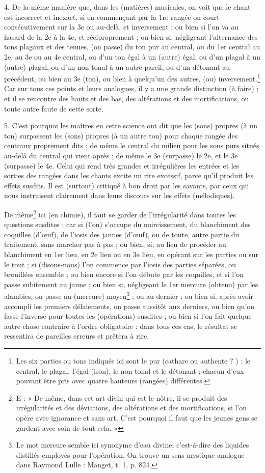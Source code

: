 \documentclass[a4paper, 11pt, oneside, polutonikogreek, french]{article}
\begin{document}
4. De la même manière que, dans les (matières) musicales, on voit que le chant est incorrect et inexact, si en commençant par la 1re rangée on court consécutivement sur la 3e ou au-delà, et inversement ; ou bien si l'on va au hasard de la 2e à la 4e, et réciproprement ; ou bien si, négligeant l'alternance des tons plagaux et des tenues, (on passe) du ton pur au central, ou du 1er central au 2e, au 3e ou au 4e central, ou d'un ton égal à un (autre) égal, ou d'un plagal à un (autre) plagal, ou d'un non-tonal à un autre pareil, ou d'un détonant au précédent, ou bien au 3e (ton), ou bien à quelqu'un des autres, (ou) inversement.\footnote{Les six parties ou tons indiqués ici sont le pur (cathare ou authente ? ) ; le central, le plagal, l'égal (ison), le non-tonal et le détonant ; chacun d'eux pouvant être pris avec quatre hauteurs (rangées) différentes.} Car sur tous ces points et leurs analogues, il y a une grande distinction (à faire) ; et il se rencontre des hauts et des bas, des altérations et des mortifications, ou toute autre faute de cette sorte.

5. C'est pourquoi les maîtres en cette science ont dit que les (sons) propres (à un ton) surpassent les (sons) propres (à un autre ton) pour chaque rangée des centraux proprement dits ; de même le central du milieu pour les sons purs situés au-delà du central qui vient après ; de même le 3e (surpasse) le 2e, et le 3e (surpasse) le 4e. Celui qui rend très grandes et irrégulières les entrées et les sorties des rangées dans les chants excite un rire excessif, parce qu'il produit les effets susdits. Il est (surtout) critiqué à bon droit par les savants, par ceux qui nous instruisent clairement dans leurs discours sur les effets (mélodiques).

De même\footnote{E : « De même, dans cet art divin qui est le nôtre, il se produit des irrégularités et des déviations, des altérations et des mortifications, si l'on opère avec ignorance et sans art. C'est pourquoi il faut que les jeunes gens se gardent avec soin de tout cela. »} ici (en chimie), il faut se garder de l'irrégularité dans toutes les questions susdites ; car si (l'on) s'occupe du noircissement, du blanchiment des coquilles (d'œuf), de l'iosis des jaunes (d'œuf), ou de toute, autre partie du traitement, sans marcher pas à pas ; ou bien, si, au lieu de procéder au blanchiment en 1er lieu, en 2e lieu ou en 3e lieu, en opérant sur les parties ou sur le tout ; si (disons-nous) l'on commence par l'iosis des parties séparées, ou brouillées ensemble ; ou bien encore si l'on débute par les coquilles, et si l'on passe subitement au jaune ; ou bien si, négligeant le 1er mercure (obtenu) par les alambics, on passe au (mercure) moyen\footnote{Le mot mercure semble ici synonyme d'eau divine, c'est-à-dire des liquides distillés employés pour l'opération. On trouve un sens mystique analogue dans Raymond Lulle : Manget, t. 1, p. 824.} ; ou au dernier ; ou bien si, après avoir accompli les premiers délaiements, on passe aussitôt aux derniers, ou bien qu'on fasse l'inverse pour toutes les (opérations) susdites ; ou bien si l'on fait quelque autre chose contraire à l'ordre obligatoire : dans tous ces cas, le résultat se ressentira de pareilles erreurs et prêtera à rire.
\end{document}

